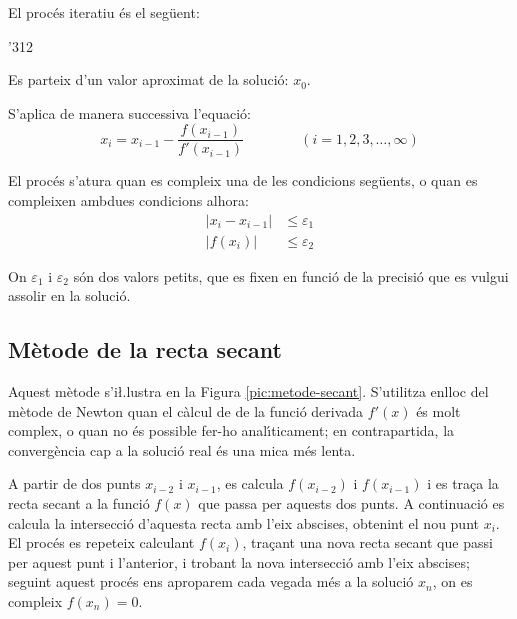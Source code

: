 El proc\'{e}s iteratiu \'{e}s el seg\"{u}ent:

\begin{dingautolist}{'312}
    \item Es parteix d'un valor aproximat de la soluci\'{o}: $x_0$.

    \item   S'aplica de manera successiva l'equaci\'{o}:
            \begin{equation}\label{eq:newton}
              x_i = x_{i-1} - \frac{f(x_{i-1})}{f'(x_{i-1})} \qquad\qquad (i=1,2,3,\dots,\infty)
            \end{equation}

    \item   El proc\'{e}s s'atura quan es compleix una de les condicions seg\"{u}ents, o quan es compleixen ambdues condicions alhora:
            \begin{subequations}\begin{align}
              |x_i - x_{i-1}| &\leq \varepsilon_1 \\
              |f(x_i)| &\leq \varepsilon_2
            \end{align}\end{subequations}

            On $\varepsilon_1$ i $\varepsilon_2$ s\'{o}n dos valors petits, que es fixen en funci\'{o} de la precisi\'{o} que es vulgui assolir en la soluci\'{o}.
\end{dingautolist}



\subsection{M\`{e}tode de la recta secant}

Aquest m\`{e}tode s'i{\l.l}ustra en la Figura \vref{pic:metode-secant}. S'utilitza enlloc del m\`{e}tode de Newton quan el c\`{a}lcul de de la funci\'{o} derivada $f'(x)$ \'{e}s molt complex, o quan no \'{e}s possible fer-ho anal\'{\i}ticament; en contrapartida, la converg\`{e}ncia cap a la soluci\'{o} real \'{e}s una
mica m\'{e}s lenta.


\begin{center}
    
    \label{pic:metode-secant}
\end{center}


A partir de dos punts $x_{i-2}$ i $x_{i-1}$, es calcula $f(x_{i-2})$ i $f(x_{i-1})$ i es tra\c{c}a la recta secant a la funci\'{o} $f(x)$ que passa per aquests dos punts. A continuaci\'{o} es calcula la intersecci\'{o} d'aquesta recta amb l'eix abscises, obtenint el nou punt $x_i$. El proc\'{e}s es repeteix calculant $f(x_i)$, tra\c{c}ant una nova recta secant que passi per aquest punt i l'anterior, i trobant la nova intersecci\'{o} amb l'eix abscises; seguint aquest proc\'{e}s ens aproparem cada vegada m\'{e}s a la soluci\'{o} $x_n$, on es compleix $f(x_n)=0$.

